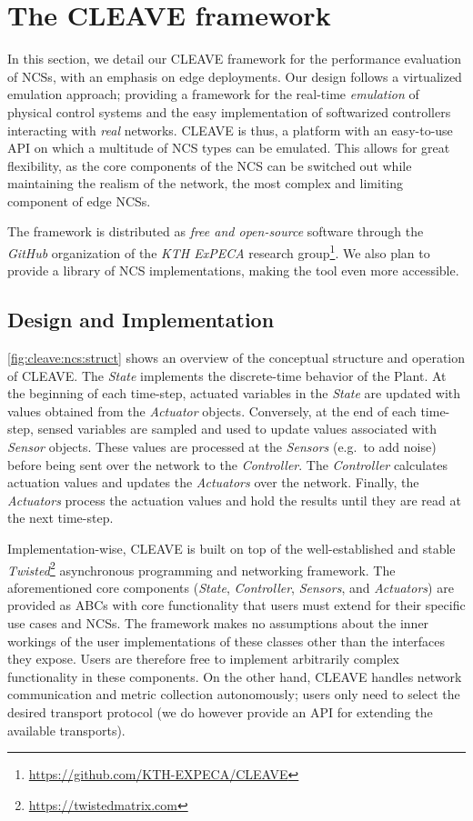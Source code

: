 \section{The \ac{CLEAVE} framework}\label{sec:approach}

In this section, we detail our \ac{CLEAVE} framework for the performance evaluation of \aclp{NCS}, with an emphasis on edge deployments.
Our design follows a virtualized emulation approach; providing a framework for the real-time \emph{emulation} of physical control systems and the easy implementation of softwarized controllers interacting with \emph{real} networks.
\ac{CLEAVE} is thus, a platform with an easy-to-use \ac{API} on which a multitude of \ac{NCS} types can be emulated.
This allows for great flexibility, as the core components of the \ac{NCS} can be switched out while maintaining the realism of the network, the most complex and limiting component of edge \acp{NCS}.

The framework is distributed as \emph{free and open-source} software through the \emph{GitHub} organization of the \emph{KTH ExPECA} research group\footnote{\url{https://github.com/KTH-EXPECA/CLEAVE}}.
We also plan to provide a library of \ac{NCS} implementations, making the tool even more accessible.

\subsection{Design and Implementation}

\cref{fig:cleave:ncs:struct} shows an overview of the conceptual structure and operation of \ac{CLEAVE}.
The \emph{State} implements the discrete-time behavior of the Plant.
At the beginning of each time-step, actuated variables in the \emph{State} are updated with values obtained from the \emph{Actuator} objects.
Conversely, at the end of each time-step, sensed variables are sampled and used to update values associated with \emph{Sensor} objects.
These values are processed at the \emph{Sensors} (e.g.\ to add noise) before being sent over the network to the \emph{Controller}.
The \emph{Controller} calculates actuation values and updates the \emph{Actuators} over the network.
Finally, the \emph{Actuators} process the actuation values and hold the results until they are read at the next time-step.

Implementation-wise, \ac{CLEAVE} is built on top of the well-established and stable \emph{Twisted}\footnote{\url{https://twistedmatrix.com}} asynchronous programming and networking framework.
The aforementioned core components (\emph{State}, \emph{Controller}, \emph{Sensors}, and \emph{Actuators}) are provided as \acp{ABC} with core functionality that users must extend for their specific use cases and \acp{NCS}.
The framework makes no assumptions about the inner workings of the user implementations of these classes other than the interfaces they expose.
Users are therefore free to implement arbitrarily complex functionality in these components.
On the other hand, \ac{CLEAVE} handles network communication and metric collection autonomously; users only need to select the desired transport protocol (we do however provide an \ac{API} for extending the available transports).

